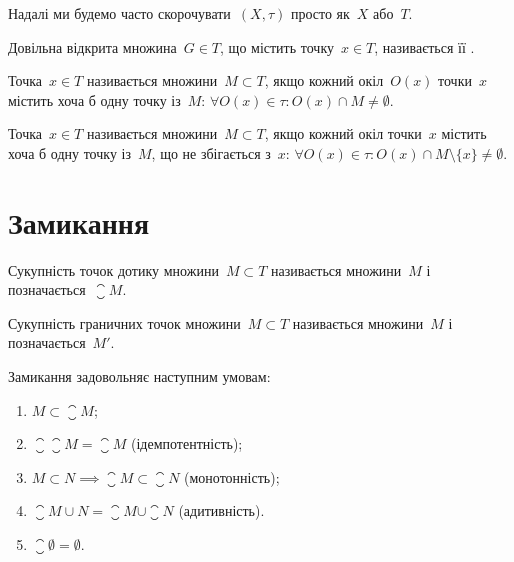 \begin{abuse}
    Надалі ми будемо часто скорочувати~$(X, \tau)$ просто як~$X$ або~$T$.
\end{abuse}

\begin{definition}
    Довільна відкрита множина~$G \in T$, що містить точку~$x \in T$, називається її .
\end{definition}

\begin{definition}
    Точка~$x \in T$ називається  множини~$M \subset T$, якщо кожний окіл~$O(x)$ точки~$x$ містить хоча б одну точку із~$M$: $\forall O(x) \in \tau: O(x) \cap M \ne \emptyset$.
\end{definition}

\begin{definition}
    Точка~$x \in T$ називається  множини~$M \subset T$, якщо кожний окіл точки~$x$ містить хоча б одну точку із~$M$, що не збігається з~$x$: $\forall O(x) \in \tau: O(x) \cap M \setminus \{x\} \ne \emptyset$.
\end{definition}

\section{Замикання}

\begin{definition}
    Сукупність точок дотику множини~$M \subset T$ називається  множини~$M$ і позначається~$\closure M$.
\end{definition}

\begin{definition}
    Сукупність граничних точок множини~$M \subset T$ називається  множини~$M$ і позначається~$M'$.
\end{definition}

\begin{theorem}
    Замикання задовольняє наступним умовам:
    \begin{enumerate}
        \item $M \subset \closure M$;
        \item $\closure{\closure{M}} = \closure M$ (ідемпотентність);
        \item $M \subset N \implies \closure M \subset \closure N$ (монотонність);
        \item $\closure {M \cup N} = \closure M \cup \closure N$ (адитивність).
        \item $\closure \emptyset = \emptyset$.
    \end{enumerate}
\end{theorem}

